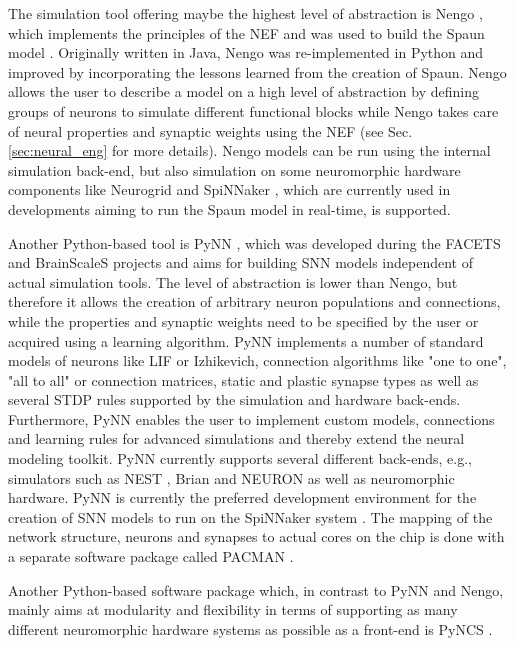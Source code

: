The simulation tool offering maybe the highest level of abstraction is \ac{Nengo} \cite{Stewart2009}, which implements the principles of the \ac{NEF} \cite{Eliasmith2003} and was used to build the \ac{Spaun} model \cite{Eliasmith2012}.
Originally written in Java, \ac{Nengo} was re-implemented in Python \cite{Bekolay2014} and improved by incorporating the lessons learned from the creation of \ac{Spaun}.
\ac{Nengo} allows the user to describe a model on a high level of abstraction by defining groups of neurons to simulate different functional blocks while \ac{Nengo} takes care of neural properties and synaptic weights using the \ac{NEF} (see Sec. \ref{sec:neural_eng} for more details).
\ac{Nengo} models can be run using the internal simulation back-end, but also simulation on some neuromorphic hardware components like Neurogrid \cite{Dethier2011, Choudhary2012} and \ac{SpiNNaker} \cite{Mundy2015}, which are currently used in developments aiming to run the \ac{Spaun} model in real-time, is supported.

Another Python-based tool is \ac{PyNN} \cite{Davies2010}, which was developed during the \ac{FACETS} \cite{FACETS-proj} and \ac{BrainScaleS} \cite{BrainScaleS-proj} projects and aims for building \ac{SNN} models independent of actual simulation tools.
The level of abstraction is lower than \ac{Nengo}, but therefore it allows the creation of arbitrary neuron populations and connections, while the properties and synaptic weights need to be specified by the user or acquired using a learning algorithm.
\ac{PyNN} implements a number of standard models of neurons like \ac{LIF} or Izhikevich, connection algorithms like "one to one", "all to all" or connection matrices, static and plastic synapse types as well as several \ac{STDP} rules supported by the simulation and hardware back-ends.
Furthermore, \ac{PyNN} enables the user to implement custom models, connections and learning rules for advanced simulations and thereby extend the neural modeling toolkit.
\ac{PyNN} currently supports several different back-ends, e.g., simulators such as \ac{NEST} \cite{Gewaltig2007}, Brian \cite{Goodman2009} and NEURON  \cite{Carnevale2009} as well as neuromorphic hardware.
\ac{PyNN} is currently the preferred development environment for the creation of \ac{SNN} models to run on the \ac{SpiNNaker} system \cite{Furber2014}.
The mapping of the network structure, neurons and synapses to actual cores on the chip is done with a separate software package called \ac{PACMAN} \cite{Galluppi2012}.

Another Python-based software package which, in contrast to \ac{PyNN} and \ac{Nengo}, mainly aims at modularity and flexibility in terms of supporting as many different neuromorphic hardware systems as possible as a front-end is \ac{PyNCS} \cite{Stefanini2014}.


